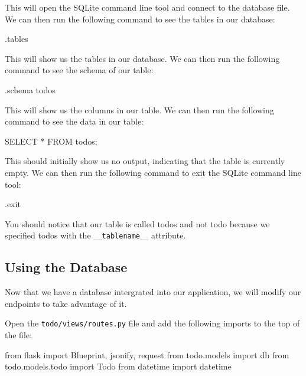 \documentclass{csse4400}
\begin{document}


This will open the SQLite command line tool and connect to the database file.
We can then run the following command to see the tables in our database:

\begin{code}[language=sql,numbers=none]{}
  .tables
\end{code}

This will show us the tables in our database.
We can then run the following command to see the schema of our table:

\begin{code}[language=sql,numbers=none]{}
  .schema todos
\end{code}

This will show us the columns in our table.
We can then run the following command to see the data in our table:

\begin{code}[language=sql,numbers=none]{}
  SELECT * FROM todos;
\end{code}

This should initially show us no output, indicating that the table is currently empty.
We can then run the following command to exit the SQLite command line tool:

\begin{code}[language=sql,numbers=none]{}
  .exit
\end{code}

You should notice that our table is called todos and not todo because we specified todos with the \texttt{\_\_tablename\_\_} attribute.


\subsection{Using the Database}

Now that we have a database intergrated into our application,
we will modify our endpoints to take advantage of it. 

Open the \texttt{todo/views/routes.py} file and add the following imports to the top of the file:

\begin{code}[language=python,numbers=none]{}
from flask import Blueprint, jsonify, request
from todo.models import db
from todo.models.todo import Todo
from datetime import datetime
\end{code}
\end{document}
